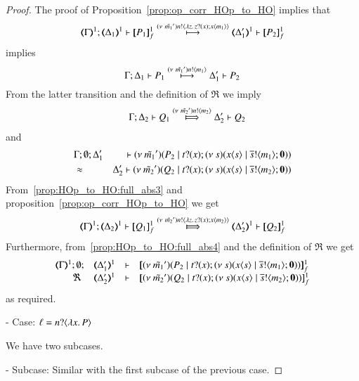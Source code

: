 \begin{proof}
	\noi The proof of Proposition~\ref{prop:op_corr_HOp_to_HO} implies that
%
	\[
		\horel{\mapt{\Gamma}^{1}}{\mapt{\Delta_1}^{1}}{\pmapp{P_1}{1}{f}}{\hby{\news{\tilde{m_1}'} \bactout{n}{\abs{z}{\binp{z}{x} \appl{x}{m_1}}}}}{\mapt{\Delta_1'}^{1}}{\pmapp{P_2}{1}{f}}
	\]
%
	\noi implies
%
	\[
		\Gamma; \Delta_1 \vdash P_1 \stackrel{(\nu\ \tilde{m_1}') n ! \langle m_1 \rangle}{\longmapsto} \Delta_1' \vdash P_2
	\]
%
	\noi From the latter transition and the definition of $\Re$ we imply
%
	\begin{eqnarray}
		&&\horel{\Gamma}{\Delta_2}{Q_1}{\Hby{\news{\tilde{m_2}'} \bactout{n}{m_2}}}{\Delta_2'}{Q_2}
		\label{prop:HOp_to_HO:full_abs3}
	\end{eqnarray}
%
	\noi and
%
	\begin{eqnarray}
		& \Gamma; \emptyset; \Delta_1' & \vdash (\nu\ \tilde{m_1}')(P_2 \;|\; t ? (x) ; (\nu\ s)(x\langle s \rangle \;|\; \overline{s} ! \langle m_1 \rangle ; \mathbf{0})) \nonumber \\
		& \approx & \Delta_2' \vdash (\nu\ \tilde{m_2}')(Q_2 \;|\; t ? (x) ; (\nu\ s)(x\langle s \rangle \;|\; \overline{s} ! \langle m_2 \rangle ; \mathbf{0}))
		\label{prop:HOp_to_HO:full_abs4}
	\end{eqnarray}
%
	\noi From~\ref{prop:HOp_to_HO:full_abs3} and proposition~\ref{prop:op_corr_HOp_to_HO} we get
%
	\[
		\horel{\mapt{\Gamma}^{1}}{\mapt{\Delta_2}^{1}}{\pmapp{Q_1}{1}{f}}{\Hby{\news{\tilde{m_2}'} \bactout{n}{\abs{z}{\binp{z}{x} \appl{x}{m_2}}}}}{\mapt{\Delta_2'}^{1}}{\pmapp{Q_2}{1}{f}}
	\]
%
	\noi Furthermore, from~\ref{prop:HOp_to_HO:full_abs4} and the definition of $\Re$ we get
%
	\[
		\mhorel{\mapt{\Gamma}^{1}}{\mapt{\Delta_1'}^{1}}{\pmapp{\newsp{\tilde{m_1}'}{P_2 \Par \hotrigger{t}{x}{s}{m_1}}}{1}{f}}
		{\ \Re\ }{\mapt{\Delta_2'}^{1}}{}{\pmapp{\newsp{\tilde{m_2}'}{Q_2 \Par \hotrigger{t}{x}{s}{m_2}}}{1}{f}}
	\]
%
	\noi as required.

	\noi - Case: $\ell = n ? \langle \lambda x.\,P \rangle$

	\noi We have two subcases.

	\noi - Subcase: Similar with the first subcase of the previous case.


\end{proof}
